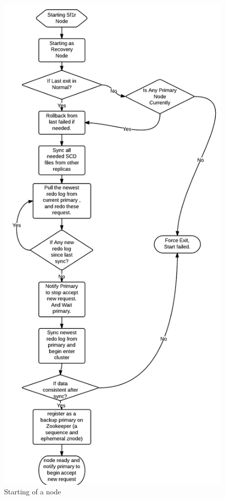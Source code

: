 \begin{figure}[!ht]\centering
  \includegraphics[width=.60\textwidth]{Figures/nodestart.png}
  \caption{Starting of a node}\label{fig:nodestart}
\end{figure}

